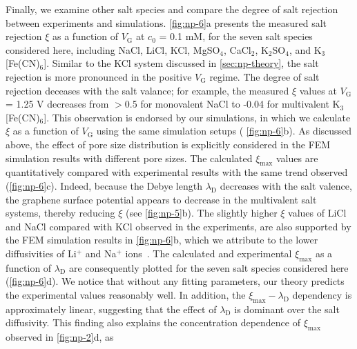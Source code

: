 Finally, we examine other salt species and compare the degree of salt
rejection between experiments and simulations.  \autoref{fig:np-6}a
presents the measured salt rejection $\xi$ as a function of
$V_{\mathrm{G}}$ at $c_{0}$ = 0.1 mM, for the seven salt species
considered here, including NaCl, LiCl, KCl, MgSO$_{4}$, CaCl$_{2}$,
K$_{2}$SO$_{4}$, and K$_{3}$[Fe(CN)$_{6}$].
%
%
Similar to the KCl system discussed in \autoref{sec:np-theory}, the
salt rejection is more pronounced in the positive $V_{\mathrm{G}}$
regime.
%
The degree of salt rejection deceases with the salt valance; for
example, the measured $\xi$ values at $V_{\mathrm{G}}$ = 1.25 V
decreases from $>$0.5 for mono\-valent NaCl to -0.04 for multi\-valent
K$_{3}$[Fe(CN)$_{6}$].
%
This observation is endorsed by our simulations, in which we calculate
$\xi$ as a function of $V_{\mathrm{G}}$ using the same simulation
setups ( \autoref{fig:np-6}b).
%
As discussed above, the effect of pore
size distribution is explicitly considered in the FEM simulation
results with different pore sizes.
%
The calculated
$\xi_{\mathrm{max}}$ values are quantitatively compared with
experimental results with the same trend observed (\autoref{fig:np-6}c).
%
Indeed, because the Debye length $\lambda_{\mathrm{D}}$ decreases with
the salt valence, the graphene surface potential appears to decrease
in the multivalent salt systems, thereby reducing $\xi$ (see
\autoref{fig:np-5}b).  
The slightly higher $\xi$ values of LiCl and NaCl compared with KCl
observed in the experiments, are also supported by the FEM simulation
results in \autoref{fig:np-6}b, which we attribute to the lower
diffusivities of Li$^{+}$ and Na$^{+}$
ions~\cite{vanysek_2000_CRC_diffusivity}.
%
The calculated and
experimental $\xi_{\mathrm{max}}$ as a function of
$\lambda_{\mathrm{D}}$ are consequently plotted for the seven salt
species considered here (\autoref{fig:np-6}d).  
We notice that
without any fitting parameters, our theory predicts the
experimental values reasonably well.
%
In addition, the $\xi_{\mathrm{max}}-\lambda_{\mathrm{D}}$ dependency
is approximately linear, suggesting that the effect of
$\lambda_{\mathrm{D}}$ is dominant over the salt diffusivity.
%
This
finding also explains the concentration dependence of
$\xi_{\mathrm{max}}$ observed in \autoref{fig:np-2}d, as
